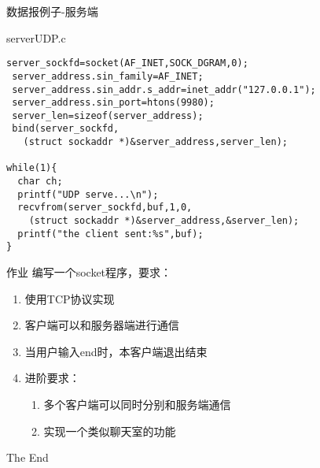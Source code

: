 \documentclass{beamer}
\begin{document}
\begin{frame}[fragile]{数据报例子-服务端}
\begin{block}{serverUDP.c}
\begin{verbatim}
server_sockfd=socket(AF_INET,SOCK_DGRAM,0);
 server_address.sin_family=AF_INET;
 server_address.sin_addr.s_addr=inet_addr("127.0.0.1");
 server_address.sin_port=htons(9980);
 server_len=sizeof(server_address);
 bind(server_sockfd,
   (struct sockaddr *)&server_address,server_len);

while(1){
  char ch;
  printf("UDP serve...\n");
  recvfrom(server_sockfd,buf,1,0,
    (struct sockaddr *)&server_address,&server_len);
  printf("the client sent:%s",buf);
}

\end{verbatim}
\end{block}
\end{frame}
\begin{frame}{作业}
编写一个socket程序，要求：
\begin{enumerate}
\item
使用TCP协议实现
\item
客户端可以和服务器端进行通信
\item
当用户输入end时，本客户端退出结束
\item
进阶要求：
\begin{enumerate}
\item
多个客户端可以同时分别和服务端通信
\item
实现一个类似聊天室的功能
\end{enumerate}

\end{enumerate}
\end{frame}

\begin{frame}
\Huge{\centerline{The End}}
\end{frame}
\end{document}
